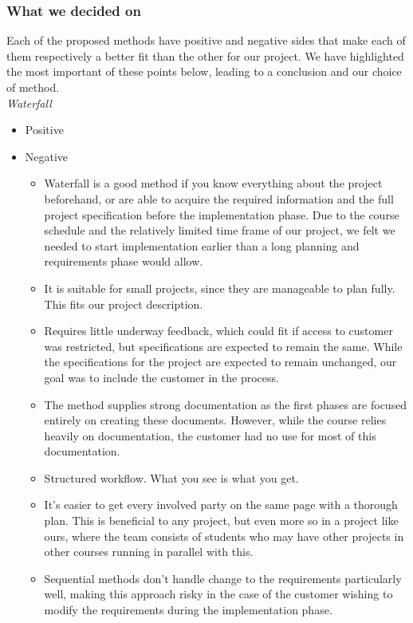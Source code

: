 \subsubsection{What we decided on}
Each of the proposed methods have positive and negative sides that make each of them respectively a better fit than the other for our project. We have highlighted the most important of these points below, leading to a conclusion and our choice of method. \\
\emph{Waterfall}
\begin{itemize}
\item Positive
\item Negative
	\begin{itemize}
		\item Waterfall is a good method if you know everything about the project beforehand, or are able to acquire the required information and the full project specification before the implementation phase. Due to the course schedule and the relatively limited time frame of our project, we felt we needed to start implementation earlier than a long planning and requirements phase would allow.
		\item It is suitable for small projects, since they are manageable to plan fully. This fits our project description.
		\item Requires little underway feedback, which could fit if access to customer was restricted, but specifications are expected to remain the same. While the specifications for the project are expected to remain unchanged, our goal was to include the customer in the process.
		\item The method supplies strong documentation as the first phases are focused entirely on creating these documents. However, while the course relies heavily on documentation, the customer had no use for most of this documentation.
		\item Structured workflow. What you see is what you get. %
		\item It's easier to get every involved party on the same page with a thorough plan. This is beneficial to any project, but even more so in a project like ours, where the team consists of students who may have other projects in other courses running in parallel with this.
		\item Sequential methods don't handle change to the requirements particularly well, making this approach risky in the case of the customer wishing to modify the requirements during the implementation phase.
	\end{itemize}
\end{itemize}

